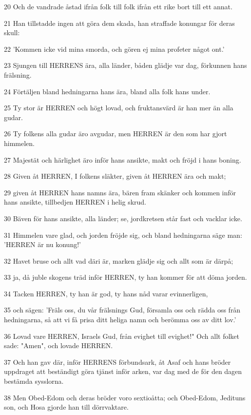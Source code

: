 \par 20 Och de vandrade åstad ifrån folk till folk ifrån ett rike bort till ett annat.
\par 21 Han tillstadde ingen att göra dem skada, han straffade konungar för deras skull:
\par 22 'Kommen icke vid mina smorda, och gören ej mina profeter något ont.'
\par 23 Sjungen till HERRENS ära, alla länder, båden glädje var dag, förkunnen hans frälsning.
\par 24 Förtäljen bland hedningarna hans ära, bland alla folk hans under.
\par 25 Ty stor är HERREN och högt lovad, och fruktansvärd är han mer än alla gudar.
\par 26 Ty folkens alla gudar äro avgudar, men HERREN är den som har gjort himmelen.
\par 27 Majestät och härlighet äro inför hans ansikte, makt och fröjd i hans boning.
\par 28 Given åt HERREN, I folkens släkter, given åt HERREN ära och makt;
\par 29 given åt HERREN hans namns ära, bären fram skänker och kommen inför hans ansikte, tillbedjen HERREN i helig skrud.
\par 30 Bäven för hans ansikte, alla länder; se, jordkretsen står fast och vacklar icke.
\par 31 Himmelen vare glad, och jorden fröjde sig, och bland hedningarna säge man: 'HERREN är nu konung!'
\par 32 Havet bruse och allt vad däri är, marken glädje sig och allt som är därpå;
\par 33 ja, då juble skogens träd inför HERREN, ty han kommer för att döma jorden.
\par 34 Tacken HERREN, ty han är god, ty hans nåd varar evinnerligen,
\par 35 och sägen: 'Fräls oss, du vår frälsnings Gud, församla oss och rädda oss från hedningarna, så att vi få prisa ditt heliga namn och berömma oss av ditt lov.'
\par 36 Lovad vare HERREN, Israels Gud, från evighet till evighet!" Och allt folket sade: "Amen", och lovade HERREN.
\par 37 Och han gav där, inför HERRENS förbundsark, åt Asaf och hans bröder uppdraget att beständigt göra tjänst inför arken, var dag med de för den dagen bestämda sysslorna.
\par 38 Men Obed-Edom och deras bröder voro sextioåtta; och Obed-Edom, Jedituns son, och Hosa gjorde han till dörrvaktare.
